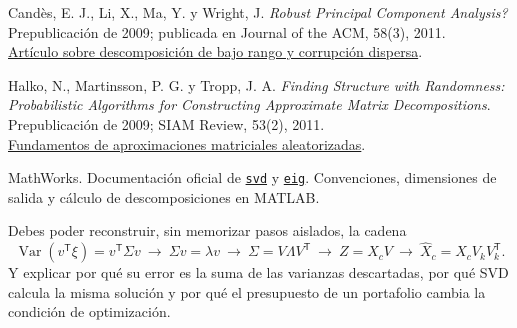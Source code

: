\documentclass[11pt,a4paper]{article}
\newcommand{\T}{^{\mathsf T}}
\DeclareMathOperator{\Var}{Var}
\theoremstyle{definition}
\begin{document}
\begin{enumerate}[label={[\arabic*]},itemsep=5pt]
\item Candès, E. J., Li, X., Ma, Y. y Wright, J. \textit{Robust Principal Component Analysis?} Prepublicación de 2009; publicada en Journal of the ACM, 58(3), 2011.\\
\href{https://arxiv.org/abs/0912.3599}{Artículo sobre descomposición de bajo rango y corrupción dispersa}.
\item Halko, N., Martinsson, P. G. y Tropp, J. A. \textit{Finding Structure with Randomness: Probabilistic Algorithms for Constructing Approximate Matrix Decompositions}. Prepublicación de 2009; SIAM Review, 53(2), 2011.\\
\href{https://arxiv.org/abs/0909.4061}{Fundamentos de aproximaciones matriciales aleatorizadas}.
\item MathWorks. Documentación oficial de \href{https://www.mathworks.com/help/matlab/ref/double.svd.html}{\texttt{svd}} y \href{https://www.mathworks.com/help/matlab/ref/eig.html}{\texttt{eig}}. Convenciones, dimensiones de salida y cálculo de descomposiciones en MATLAB.
\end{enumerate}
\begin{idea}
Debes poder reconstruir, sin memorizar pasos aislados, la cadena
\[
\Var(v\T\xi)=v\T\Sigma v
\ \longrightarrow\ \Sigma v=\lambda v
\ \longrightarrow\ \Sigma=V\Lambda V\T
\ \longrightarrow\ Z=X_cV
\ \longrightarrow\ \widehat X_c=X_cV_kV_k\T.
\]
Y explicar por qué su error es la suma de las varianzas descartadas, por qué SVD calcula la misma solución y por qué el presupuesto de un portafolio cambia la condición de optimización.
\end{idea}
\end{document}

